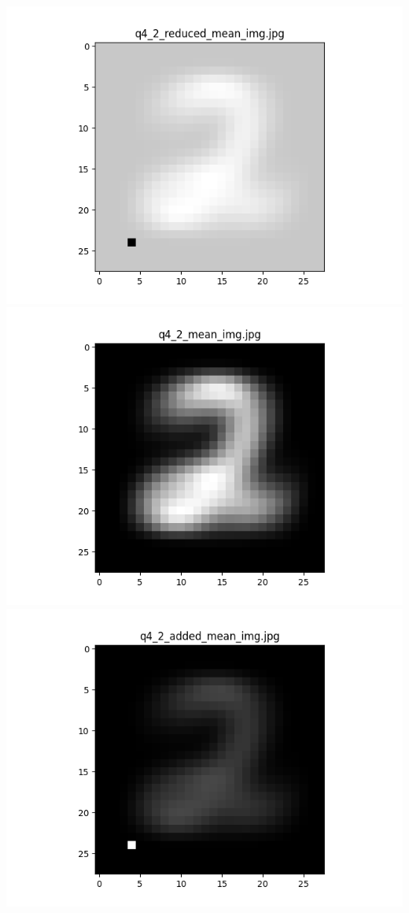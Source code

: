 \documentclass{article}
\begin{document}
    \\
    \includegraphics[scale=.37]{../results/q4/reduced_mean_images/q4_2_reduced_mean_img.png}
    \includegraphics[scale=.37]{../results/q4/mean_images/q4_2_mean_img.png}
    \includegraphics[scale=.37]{../results/q4/added_mean_images/q4_2_added_mean_img.png}
\end{document}
